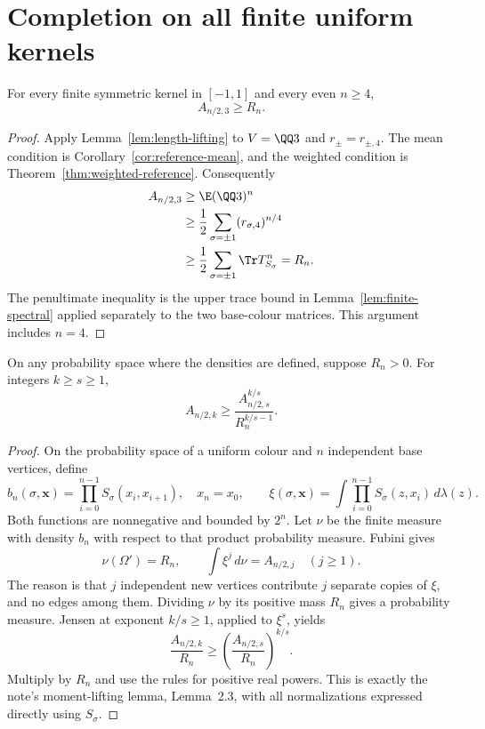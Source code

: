 \section{Completion on all finite uniform kernels}
\label{sec:finite-completion}

\begin{theorem}
\label{thm:finite-three}
\proved For every finite symmetric kernel in $[-1,1]$ and every even $n\ge4$,
\[
 A_{n/2,3}\ge R_n.
\]
\end{theorem}
\begin{proof}
Apply Lemma~\ref{lem:length-lifting} to $V=\QQ3$ and $r_\pm=r_{\pm,4}$.
The mean condition is Corollary~\ref{cor:reference-mean}, and the weighted condition is
Theorem~\ref{thm:weighted-reference}.  Consequently
\begin{align*}
 A_{n/2,3}
 &\ge\E(\QQ3)^n\\
 &\ge\frac12\sum_{\sigma=\pm1}(r_{\sigma,4})^{n/4}\\
 &\ge\frac12\sum_{\sigma=\pm1}\Tr T_{S_\sigma}^{n}=R_n.
\end{align*}
The penultimate inequality is the upper trace bound in Lemma~\ref{lem:finite-spectral}
applied separately to the two base-colour matrices.  This argument includes $n=4$.
\end{proof}

\begin{lemma}
\label{lem:apex-lifting}
\proved On any probability space where the densities are defined, suppose $R_n>0$.
For integers $k\ge s\ge1$,
\[
 A_{n/2,k}\ge\frac{A_{n/2,s}^{k/s}}{R_n^{k/s-1}}.
\]
\end{lemma}
\begin{proof}
On the probability space of a uniform colour and $n$ independent base vertices, define
\[
 b_n(\sigma,\mathbf x)=\prod_{i=0}^{n-1}S_\sigma(x_i,x_{i+1}),\quad x_n=x_0,
 \qquad
 \xi(\sigma,\mathbf x)=\int\prod_{i=0}^{n-1}S_\sigma(z,x_i)\,d\lambda(z).
\]
Both functions are nonnegative and bounded by $2^n$.  Let $\nu$ be the finite measure with
density $b_n$ with respect to that product probability measure.  Fubini gives
\[
 \nu(\Omega')=R_n,\qquad \int\xi^j\,d\nu=A_{n/2,j}\quad(j\ge1).
\]
The reason is that $j$ independent new vertices contribute $j$ separate copies of $\xi$,
and no edges among them.  Dividing $\nu$ by its positive mass $R_n$ gives a probability
measure.  Jensen at exponent $k/s\ge1$, applied to $\xi^s$, yields
\[
 \frac{A_{n/2,k}}{R_n}
 \ge\left(\frac{A_{n/2,s}}{R_n}\right)^{k/s}.
\]
Multiply by $R_n$ and use the rules for positive real powers.  This is exactly the note's
moment-lifting lemma, Lemma~2.3, with all normalizations expressed directly using $S_\sigma$.
\end{proof}

